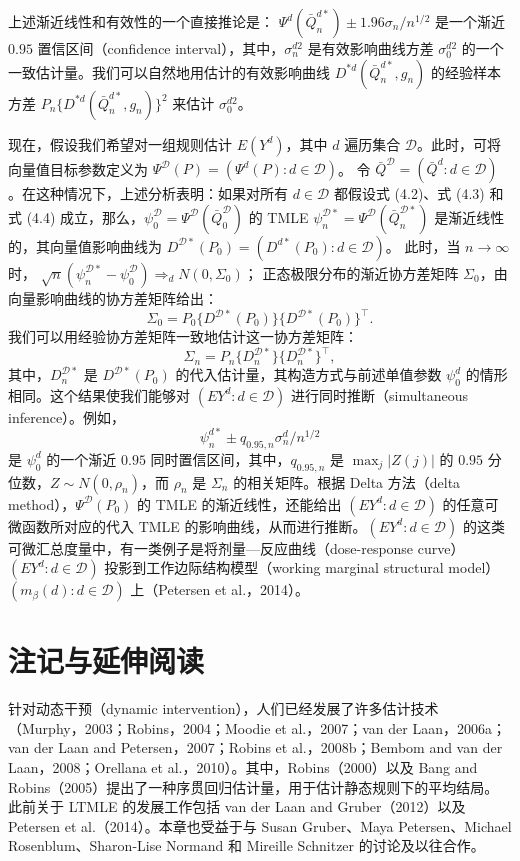 上述渐近线性和有效性的一个直接推论是：
$\Psi^d(\bar Q_n^{d*})\pm1.96\sigma_n/n^{1/2}$
是一个渐近 $0.95$ 置信区间（confidence interval），其中，$\sigma_n^{d2}$ 是有效影响曲线方差 $\sigma_0^{d2}$ 的一个一致估计量。我们可以自然地用估计的有效影响曲线 $D^{*d}(\bar Q_n^{d*},g_n)$ 的经验样本方差
$P_n\{D^{*d}(\bar Q_n^{d*},g_n)\}^2$
来估计 $\sigma_0^{d2}$。

现在，假设我们希望对一组规则估计 $E(Y^d)$，其中 $d$ 遍历集合 $\mathcal D$。此时，可将向量值目标参数定义为
$\Psi^{\mathcal D}(P)=(\Psi^d(P):d\in\mathcal D)$。
令 $\bar Q^{\mathcal D}=(\bar Q^d:d\in\mathcal D)$。在这种情况下，上述分析表明：如果对所有 $d\in\mathcal D$ 都假设式 (4.2)、式 (4.3) 和式 (4.4) 成立，那么，$\psi_0^{\mathcal D}=\Psi^{\mathcal D}(\bar Q_0^{\mathcal D})$ 的 TMLE
$\psi_n^{\mathcal D*}=\Psi^{\mathcal D}(\bar Q_n^{\mathcal D*})$
是渐近线性的，其向量值影响曲线为
$D^{\mathcal D*}(P_0)=(D^{d*}(P_0):d\in\mathcal D)$。
此时，当 $n\to\infty$ 时，
$\sqrt n(\psi_n^{\mathcal D*}-\psi_0^{\mathcal D})
 \Rightarrow_d N(0,\Sigma_0)$；
正态极限分布的渐近协方差矩阵 $\Sigma_0$，由向量影响曲线的协方差矩阵给出：
\[
 \Sigma_0=P_0\{D^{\mathcal D*}(P_0)\}
                  \{D^{\mathcal D*}(P_0)\}^{\top}.
\]
我们可以用经验协方差矩阵一致地估计这一协方差矩阵：
\[
 \Sigma_n=P_n\{D_n^{\mathcal D*}\}\{D_n^{\mathcal D*}\}^{\top},
\]
其中，$D_n^{\mathcal D*}$ 是 $D^{\mathcal D*}(P_0)$ 的代入估计量，其构造方式与前述单值参数 $\psi_0^d$ 的情形相同。这个结果使我们能够对 $(EY^d:d\in\mathcal D)$ 进行同时推断（simultaneous inference）。例如，
\[
 \psi_n^{d*}\pm q_{0.95,n}\sigma_n^d/n^{1/2}
\]
是 $\psi_0^d$ 的一个渐近 $0.95$ 同时置信区间，其中，$q_{0.95,n}$ 是 $\max_j|Z(j)|$ 的 $0.95$ 分位数，$Z\sim N(0,\rho_n)$，而 $\rho_n$ 是 $\Sigma_n$ 的相关矩阵。根据 Delta 方法（delta method），$\Psi^{\mathcal D}(P_0)$ 的 TMLE 的渐近线性，还能给出 $(EY^d:d\in\mathcal D)$ 的任意可微函数所对应的代入 TMLE 的影响曲线，从而进行推断。$(EY^d:d\in\mathcal D)$ 的这类可微汇总度量中，有一类例子是将剂量—反应曲线（dose-response curve）$(EY^d:d\in\mathcal D)$ 投影到工作边际结构模型（working marginal structural model）$(m_\beta(d):d\in\mathcal D)$ 上（Petersen et al.，2014）。

\section{注记与延伸阅读}
\label{sec:ch04-notes}

针对动态干预（dynamic intervention），人们已经发展了许多估计技术（Murphy，2003；Robins，2004；Moodie et al.，2007；van der Laan，2006a；van der Laan and Petersen，2007；Robins et al.，2008b；Bembom and van der Laan，2008；Orellana et al.，2010）。其中，Robins（2000）以及 Bang and Robins（2005）提出了一种序贯回归估计量，用于估计静态规则下的平均结局。此前关于 LTMLE 的发展工作包括 van der Laan and Gruber（2012）以及 Petersen et al.（2014）。本章也受益于与 Susan Gruber、Maya Petersen、Michael Rosenblum、Sharon-Lise Normand 和 Mireille Schnitzer 的讨论及以往合作。

